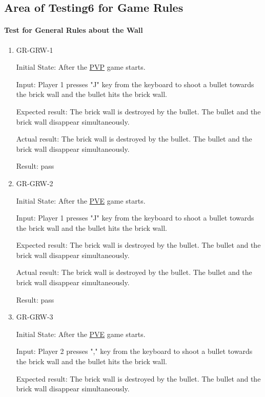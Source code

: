 \documentclass[12pt, titlepage]{article}
\begin{document}
\subsection{Area of Testing6 for Game Rules}

\paragraph{Test for General Rules about the Wall}

\begin{enumerate}

\item{GR-GRW-1\\}
					
Initial State: After the \underline{PVP} game starts. 
					
Input: Player 1 presses "J" key from the keyboard to shoot a bullet towards the brick wall and the bullet hits the brick wall.
					
Expected result: The brick wall is destroyed by the bullet. The bullet and the brick wall disappear simultaneously.
					
Actual result: The brick wall is destroyed by the bullet. The bullet and the brick wall disappear simultaneously.

Result: pass

\item{GR-GRW-2\\}
					
Initial State: After the \underline{PVE} game starts. 
					
Input: Player 1 presses "J" key from the keyboard to shoot a bullet towards the brick wall and the bullet hits the brick wall.
					
Expected result: The brick wall is destroyed by the bullet. The bullet and the brick wall disappear simultaneously.
					
Actual result: The brick wall is destroyed by the bullet. The bullet and the brick wall disappear simultaneously.

Result: pass

\item{GR-GRW-3\\}
					
Initial State: After the \underline{PVE} game starts. 
					
Input: Player 2 presses "," key from the keyboard to shoot a bullet towards the brick wall and the bullet hits the brick wall.
					
Expected result: The brick wall is destroyed by the bullet. The bullet and the brick wall disappear simultaneously.
					

\end{enumerate}
\end{document}
